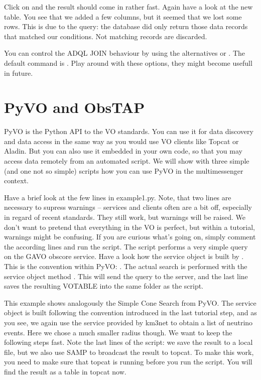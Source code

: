 \documentclass[twoside]{article}[12pt]
\begin{document}
Click on  and the result should come in rather fast.
Again have a look at the new table. You see that we added a few columns,
but it seemed that we lost some rows. This is due to the query: the
database did only return those data records that matched our conditions.
Not matching records are discarded.
\ADQLSTD

\begin{exercise}
You can control the ADQL JOIN behaviour by using the alternatives
 or . The
default command is . Play around with these options,
they might become usefull in future. 
\end{exercise}



\section{PyVO and ObsTAP}

PyVO is the Python API to the VO standards. You can use it for data
discovery and data access in the same way as you would use VO clients
like Topcat or Aladin. But you can also use it embedded in your own
code, so that you may access data remotely from an automated script. We
will show with three simple (and one not so simple) scripts how you can
use PyVO in the multimessenger context. 


Have a brief look at the few lines in example1.py. Note, that two lines
are necessary to supress warnings -- services and clients often are a
bit off, especially in regard of recent standards. They still work, but
warnings will be raised. We don't want to pretend that everything in the
VO is perfect, but within a tutorial, warnings might be confusing. If
you are curious what's going on, simply comment the according lines and
run the script. 
The script performs a very simple query on the GAVO obscore service.
Have a look how the service object is built by
. This is the convention within PyVO:
. 
The actual search is performed with the service object method
. This will send the query to the server, and the last line
saves the resulting VOTABLE into the same folder as the script. 


This example shows analogously the Simple Cone Search from PyVO. The
service object is built following the convention introduced in the last
tutorial step, and as you see, we again use the service provided by
km3net to obtain a list of neutrino events. Here we chose a much smaller
radius though. We want to keep the following steps fast. Note the last
lines of the script: we save the result to a local file, but we also use
SAMP to broadcast the result to topcat. To make this work, you need to
make sure that topcat is running before you run the script. You will
find the result as a table in topcat now. 
\end{document}
